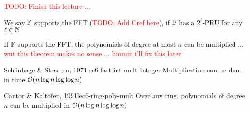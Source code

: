 \begin{lemma}{}{}
    
\end{lemma}

\textcolor{red}{TODO: Finish this lecture ... }

\begin{definition}{}{}
    We say $\operatorname{\mathbb{F}}$ \ul{supports} the FFT (\textcolor{red}{TODO: Add Cref here}), if $\operatorname{\mathbb{F}}$ has a $2^\ell$-PRU for any $\ell \in \operatorname{\mathbb{N}}$
\end{definition}

\begin{theorem}{}{}
    If $\operatorname{\mathbb{F}}$ supports the FFT, the polynomials of degree at most $n$ can be multiplied ... \textcolor{red}{wut this theorem makes no sense ... hmmm i'll fix this later}
\end{theorem}

\begin{theorem}{Sch\"{o}nhage \& Strassen, 1971}{lec6-fast-int-mult}
    Integer Multiplication can be done in time $\operatorname{\mathcal{O}}(n\log n \log\log n)$ 
\end{theorem}

\begin{theorem}{Cantor \& Kaltofen, 1991}{lec6-ring-poly-mult}
    Over any ring, polynomials of degree $n$ can be multiplied in $\operatorname{\mathcal{O}}(n \log n \log\log n)$
\end{theorem}

